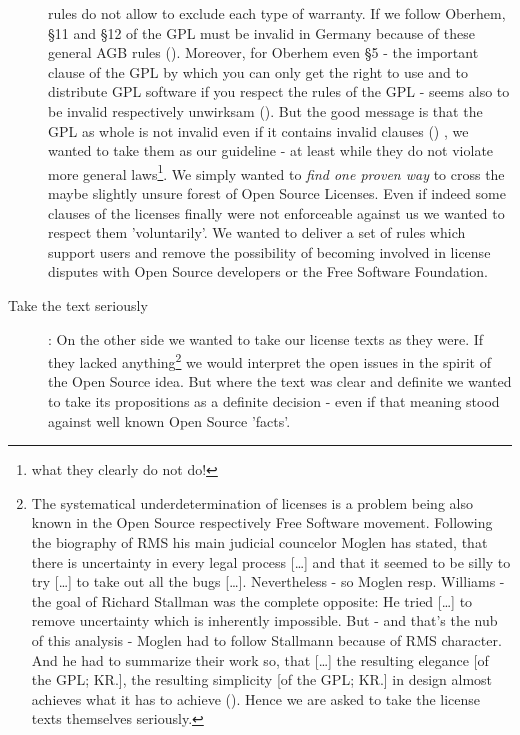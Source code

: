 \begin{description}
{  rules do not allow to exclude each type of warranty. If we follow Oberhem, §11
  and §12 of the GPL must be invalid in Germany because of these general AGB
  rules (\cite[cf.][150ff]{Oberhem2008a}). Moreover, for Oberhem even §5 - the
  important clause of the GPL by which you can only get the right to use and to
  distribute GPL software if you respect the rules of the GPL - seems also to be
  invalid respectively \glqq{}unwirksam\grqq{} (\cite[cf.][146]{Oberhem2008a}).
  But the good message is that the GPL as whole is not invalid even if it
  contains invalid clauses (\cite[cf.][159]{Oberhem2008a}) }, we wanted to take
  them as our guideline - at least while they do not violate more general
  laws\footnote{what they clearly do not do!}. We simply wanted to \emph{find one
  proven way} to cross the maybe slightly unsure forest of Open Source Licenses.
  Even if indeed some clauses of the licenses finally were not enforceable
  against us we wanted to respect them 'voluntarily'. We wanted to deliver a set
  of rules which support users and remove the possibility of becoming involved
  in license disputes with Open Source developers or the Free Software
  Foundation.
  \item[Take the text seriously]: On the other side we wanted to take our
  license texts as they were. If they lacked anything\footnote{The systematical
  underdetermination of licenses is a problem being also known in the Open
  Source respectively Free Software movement. Following the biography of RMS his
  main judicial councelor Moglen has stated, that \glqq{}there is uncertainty in
  every legal process [\ldots] \grqq{} and that it seemed to be silly to try
  \glqq{}[\ldots] to take out all the bugs [\ldots]\grqq{}. Nevertheless - so
  Moglen resp. Williams - the goal of Richard Stallman was \glqq{}the complete
  opposite\grqq{}: He tried \glqq{}[\ldots] to remove uncertainty which is
  inherently impossible\grqq{}. But - and that's the nub of this analysis -
  Moglen had to follow Stallmann because of RMS character. And he had to
  summarize their work so, that \glqq{}[\ldots] the resulting elegance [of the
  GPL; KR.], the resulting simplicity [of the GPL; KR.] in design almost
  achieves what it has to achieve\grqq{} (\cite[cf.][177f]{Williams2002a}).
  Hence we are asked to take the license texts themselves seriously.} we would
  interpret the open issues in the spirit of the Open Source idea. But where the
  text was clear and definite we wanted to take its propositions as a definite
  decision - even if that meaning stood against well known Open Source 'facts'.

\end{description}
